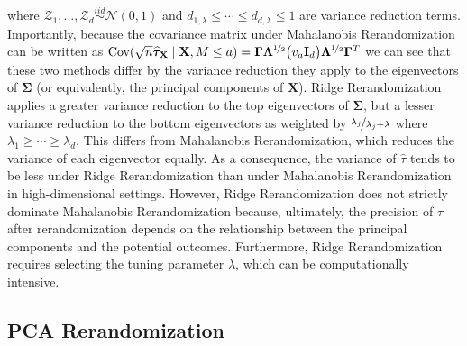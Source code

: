 \documentclass[11pt,twoside]{article}
\theoremstyle{definition}
\theoremstyle{remark}
\begin{document}
where $\mathcal{Z}_1, \ldots, \mathcal{Z}_d \overset{iid}{\sim} \mathcal{N}(0, 1)$ and $d_{1, \lambda} \leq \cdots \leq d_{d, \lambda} \leq 1$ are variance reduction terms. Importantly, because the covariance matrix under Mahalanobis Rerandomization can be written as $\text{Cov}(\sqrt{n}\widehat{\bm{\tau}}_{\mathbf{X}} \mid \mathbf{X}, M \leq a ) = \mathbf{\Gamma} \mathbf{\Lambda}^{\nicefrac{1}{2}}\big( v_a \mathbf{I}_d \big) \mathbf{\Lambda}^{\nicefrac{1}{2}} \mathbf{\Gamma}^T$ we can see that these two methods differ by the variance reduction they apply to the eigenvectors of $\mathbf{\Sigma}$ (or equivalently, the principal components of $\mathbf{X}$). Ridge Rerandomization applies a greater variance reduction to the top eigenvectors of $\mathbf{\Sigma}$, but a lesser variance reduction to the bottom eigenvectors as weighted by $\nicefrac{\lambda_j}{\lambda_j + \lambda}$ where $\lambda_1 \geq \cdots \geq \lambda_d$. This differs from Mahalanobis Rerandomization, which reduces the variance of each eigenvector equally. As a consequence, the variance of $\widehat{\tau}$ tends to be less under Ridge Rerandomization than under Mahalanobis Rerandomization in high-dimensional settings. However, Ridge Rerandomization does not strictly dominate Mahalanobis Rerandomization because, ultimately, the precision of $\widehat{\tau}$ after rerandomization depends on the relationship between the principal components and the potential outcomes. Furthermore, Ridge Rerandomization requires selecting the tuning parameter $\lambda$, which can be computationally intensive.



\subsection{PCA Rerandomization} \label{pcarerand}
\end{document}
